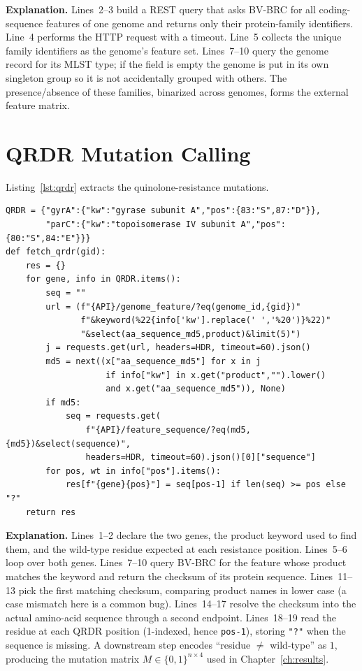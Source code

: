 \documentclass[../main.tex]{subfiles}
\begin{document}
\noindent\textbf{Explanation.} Lines~2--3 build a REST query that asks BV-BRC for all coding-sequence features of one genome and returns only their protein-family identifiers. Line~4 performs the HTTP request with a timeout. Line~5 collects the unique family identifiers as the genome's feature set. Lines~7--10 query the genome record for its MLST type; if the field is empty the genome is put in its own singleton group so it is not accidentally grouped with others. The presence/absence of these families, binarized across genomes, forms the external feature matrix.

\section{QRDR Mutation Calling}

Listing~\ref{lst:qrdr} extracts the quinolone-resistance mutations.

\begin{lstlisting}[caption={QRDR residue extraction for gyrA/parC.},label=lst:qrdr]
QRDR = {"gyrA":{"kw":"gyrase subunit A","pos":{83:"S",87:"D"}},
        "parC":{"kw":"topoisomerase IV subunit A","pos":{80:"S",84:"E"}}}
def fetch_qrdr(gid):
    res = {}
    for gene, info in QRDR.items():
        seq = ""
        url = (f"{API}/genome_feature/?eq(genome_id,{gid})"
               f"&keyword(%22{info['kw'].replace(' ','%20')}%22)"
               "&select(aa_sequence_md5,product)&limit(5)")
        j = requests.get(url, headers=HDR, timeout=60).json()
        md5 = next((x["aa_sequence_md5"] for x in j
                    if info["kw"] in x.get("product","").lower()
                    and x.get("aa_sequence_md5")), None)
        if md5:
            seq = requests.get(
                f"{API}/feature_sequence/?eq(md5,{md5})&select(sequence)",
                headers=HDR, timeout=60).json()[0]["sequence"]
        for pos, wt in info["pos"].items():
            res[f"{gene}{pos}"] = seq[pos-1] if len(seq) >= pos else "?"
    return res
\end{lstlisting}

\noindent\textbf{Explanation.} Lines~1--2 declare the two genes, the product keyword used to find them, and the wild-type residue expected at each resistance position. Lines~5--6 loop over both genes. Lines~7--10 query BV-BRC for the feature whose product matches the keyword and return the checksum of its protein sequence. Lines~11--13 pick the first matching checksum, comparing product names in lower case (a case mismatch here is a common bug). Lines~14--17 resolve the checksum into the actual amino-acid sequence through a second endpoint. Lines~18--19 read the residue at each QRDR position (1-indexed, hence \texttt{pos-1}), storing \texttt{"?"} when the sequence is missing. A downstream step encodes ``residue $\neq$ wild-type'' as $1$, producing the mutation matrix $M\in\{0,1\}^{n\times 4}$ used in Chapter~\ref{ch:results}.
\end{document}
